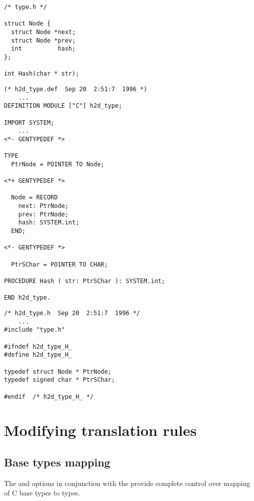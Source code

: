 {\ifonline\else\small\fi
\begin{verbatim}
/* type.h */

struct Node {
  struct Node *next;
  struct Node *prev;
  int          hash;
};

int Hash(char * str);
\end{verbatim}

\Sep %

\begin{verbatim}
(* h2d_type.def  Sep 20  2:51:7  1996 *)
    ...
DEFINITION MODULE ["C"] h2d_type;

IMPORT SYSTEM;
    ...
<*- GENTYPEDEF *>

TYPE
  PtrNode = POINTER TO Node;

<*+ GENTYPEDEF *>

  Node = RECORD
    next: PtrNode;
    prev: PtrNode;
    hash: SYSTEM.int;
  END;

<*- GENTYPEDEF *>

  PtrSChar = POINTER TO CHAR;

PROCEDURE Hash ( str: PtrSChar ): SYSTEM.int;

END h2d_type.
\end{verbatim}

\Sep %

\begin{verbatim}
/* h2d_type.h  Sep 20  2:51:7  1996 */
    ...
#include "type.h"

#ifndef h2d_type_H_
#define h2d_type_H_

typedef struct Node * PtrNode;
typedef signed char * PtrSChar;

#endif  /* h2d_type_H_ */
\end{verbatim}
} %

\section{Modifying translation rules}
\label{using:modrules}

\subsection{Base types mapping}
\label{using:modrules:mapping}

The  and  options in conjunction with the
 provide complete control over mapping of C base types
to \mt{} types.

